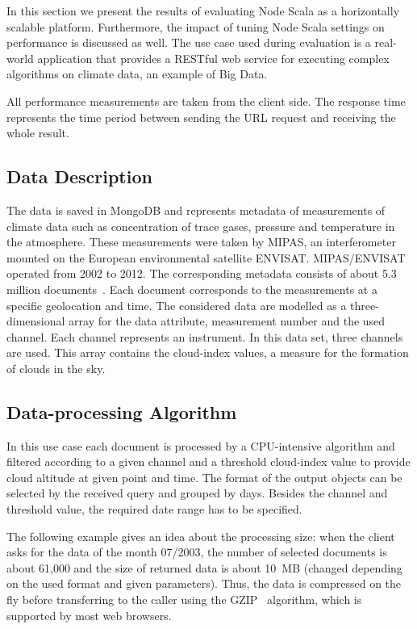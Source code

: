 \documentclass[10pt,conference,letterpaper]{IEEEtran}
\begin{document}
In this section we present the results of evaluating Node Scala as a
horizontally scalable platform.  Furthermore, the impact of tuning
Node Scala settings on performance is discussed as well. The use case
used during evaluation is a real-world application that provides a
RESTful web service for executing complex algorithms on climate data,
an example of Big Data.

All performance measurements are taken from the client side. The
response time represents the time period between sending the URL
request and receiving the whole result.

\subsection{Data Description}

The data is saved in MongoDB and represents metadata of measurements of climate
data such as concentration of trace gases, pressure and temperature in
the atmosphere. These measurements were taken by MIPAS, an interferometer mounted on the European environmental satellite ENVISAT. MIPAS/ENVISAT operated from 2002 to 2012. The corresponding metadata consists of about 5.3 million documents~\cite{Ameri14}. Each document corresponds to the measurements at a specific geolocation and
time. The considered data are modelled as a three-dimensional array for
the data attribute, measurement number and the used channel. Each
channel represents an instrument. In this data set, three channels are
used. This array contains the cloud-index values, a measure for the formation of clouds in the sky.

\subsection{Data-processing Algorithm}

In this use case each document is processed by a CPU-intensive
algorithm and filtered according to a given channel and a threshold
cloud-index value to provide cloud altitude at given point and
time. The format of the output objects can be selected by the received
query and grouped by days. Besides the channel and threshold value,
the required date range has to be specified.

The following example gives an idea about the processing size: when
the client asks for the data of the month 07/2003, the number of
selected documents is about 61,000 and the size of returned data is
about 10~MB (changed depending on the used format and given
parameters). Thus, the data is compressed on the fly before
transferring to the caller using the GZIP~\cite{GZIP} algorithm, which
is supported by most web browsers.
\end{document}
